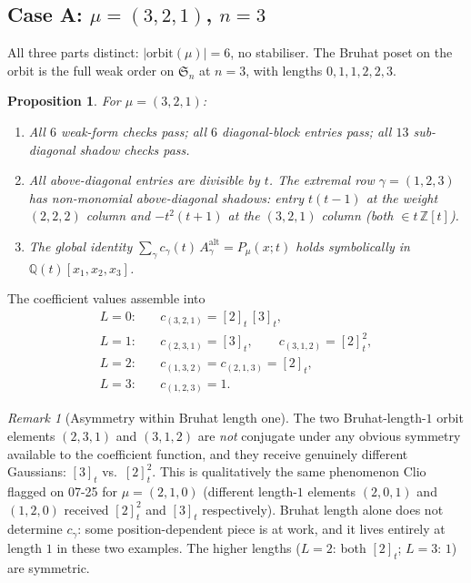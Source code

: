 \documentclass[11pt]{article}
\newtheorem{proposition}[theorem]{Proposition}
\theoremstyle{definition}
\theoremstyle{remark}
\newtheorem{remark}[theorem]{Remark}
\newcommand{\Aalt}{A^{\mathrm{alt}}}
\newcommand{\Sn}{\mathfrak{S}_n}
\newcommand{\ZZ}{\mathbb{Z}}
\newcommand{\QQ}{\mathbb{Q}}
\newcommand{\qint}[1]{[#1]_t}
\begin{document}
\subsection{Case A: $\mu = (3,2,1)$, $n = 3$}

All three parts distinct: $|\mathrm{orbit}(\mu)| = 6$, no stabiliser.
The Bruhat poset on the orbit is the full weak order on $\Sn$ at
$n=3$, with lengths $0,1,1,2,2,3$.

\begin{proposition}\label{prop:321}
For $\mu = (3,2,1)$:
\begin{enumerate}
\item[(i)]  All $6$ weak-form checks pass; all $6$ diagonal-block
            entries pass; all $13$ sub-diagonal shadow checks pass.
\item[(ii)] All above-diagonal entries are divisible by $t$.
            The extremal row $\gamma = (1,2,3)$ has non-monomial
            above-diagonal shadows: entry $t(t-1)$ at the weight
            $(2,2,2)$ column and $-t^2(t+1)$ at the $(3,2,1)$ column
            (both $\in t\,\ZZ[t]$).
\item[(iii)]The global identity
            $\sum_\gamma c_\gamma(t)\,\Aalt_\gamma = P_\mu(x;t)$
            holds symbolically in $\QQ(t)[x_1, x_2, x_3]$.
\end{enumerate}
\end{proposition}

The coefficient values assemble into
\begin{equation}\label{eq:c-321}
   \begin{aligned}
   L=0:\quad & c_{(3,2,1)} = \qint{2}\,\qint{3}, \\
   L=1:\quad & c_{(2,3,1)} = \qint{3}, \qquad c_{(3,1,2)} = \qint{2}^2, \\
   L=2:\quad & c_{(1,3,2)} = c_{(2,1,3)} = \qint{2}, \\
   L=3:\quad & c_{(1,2,3)} = 1.
   \end{aligned}
\end{equation}

\begin{remark}[Asymmetry within Bruhat length one]
The two Bruhat-length-$1$ orbit elements $(2,3,1)$ and $(3,1,2)$
are \emph{not} conjugate under any obvious symmetry available to
the coefficient function, and they receive genuinely different
Gaussians: $\qint{3}$ vs.\ $\qint{2}^2$. This is qualitatively the
same phenomenon Clio flagged on 07-25 for $\mu = (2,1,0)$
(different length-$1$ elements $(2,0,1)$ and $(1,2,0)$ received
$\qint{2}^2$ and $\qint{3}$ respectively). Bruhat length alone
does not determine $c_\gamma$: some position-dependent piece is at
work, and it lives entirely at length $1$ in these two examples.
The higher lengths ($L=2$: both $\qint{2}$; $L=3$: $1$) are
symmetric.
\end{remark}
\end{document}
